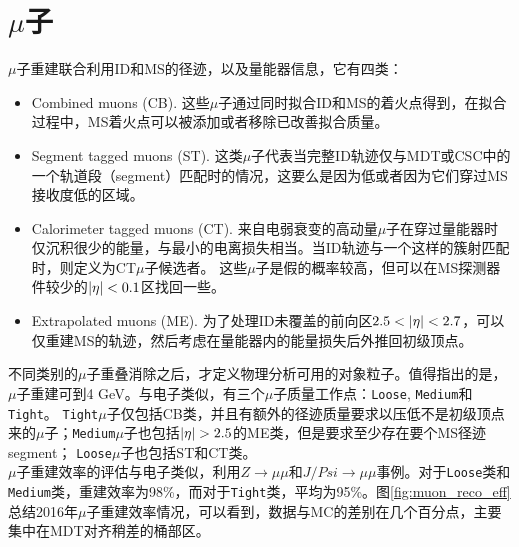 \section{$\mu$子}
$\mu$子重建联合利用ID和MS的径迹，以及量能器信息，它有四类：
\begin{itemize}
 \item Combined muons (CB). 这些$\mu$子通过同时拟合ID和MS的着火点得到，在拟合过程中，MS着火点可以被添加或者移除已改善拟合质量。
 \item Segment tagged muons (ST). 这类$\mu$子代表当完整ID轨迹仅与MDT或CSC中的一个轨道段（segment）匹配时的情况，这要么是因为\pt 低或者因为它们穿过MS接收度低的区域。
 \item Calorimeter tagged muons (CT). 来自电弱衰变的高动量$\mu$子在穿过量能器时仅沉积很少的能量，与最小的电离损失相当。当ID轨迹与一个这样的簇射匹配时，则定义为CT$\mu$子候选者。 
 这些$\mu$子是假的概率较高，但可以在MS探测器件较少的$|\eta|<0.1$区找回一些。
 \item Extrapolated muons (ME). 为了处理ID未覆盖的前向区$2.5<\abseta<2.7$，可以仅重建MS的轨迹，然后考虑在量能器内的能量损失后外推回初级顶点。
\end{itemize}
不同类别的$\mu$子重叠消除之后，才定义物理分析可用的对象粒子。值得指出的是，$\mu$子重建可到4 GeV。与电子类似，有三个$\mu$子质量工作点：\texttt{Loose}, \texttt{Medium}和\texttt{Tight}。
\texttt{Tight}$\mu$子仅包括CB类，并且有额外的径迹质量要求以压低不是初级顶点来的$\mu$子；\texttt{Medium}$\mu$子也包括$\abseta>2.5$的ME类，但是要求至少存在要个MS径迹segment；
\texttt{Loose}$\mu$子也包括ST和CT类。\\
$\mu$子重建效率的评估与电子类似，利用$Z\rightarrow \mu\mu$和$J/Psi\rightarrow \mu\mu$事例\cite{Aad2016-mu2016}。对于\texttt{Loose}类和\texttt{Medium}类，重建效率为98\%，而对于\texttt{Tight}类，平均为95\%。图\ref{fig:muon_reco_eff}总结2016年$\mu$子重建效率情况，可以看到，数据与MC的差别在几个百分点，主要集中在MDT对齐稍差的桶部区。
